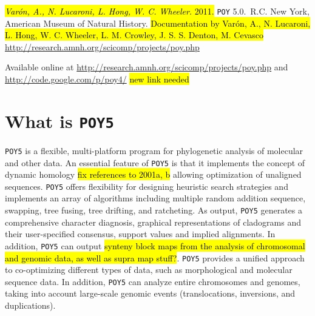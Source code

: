 \documentclass[11pt]{book}
\newcommand{\commandstyle}[1]{\texttt{#1}}
\newcommand{\poy}{\commandstyle{POY5}\xspace}
\begin{document}
\begin{flushleft}
\vspace*{0.25cm}
\hl{
\emph{Var\'on, A., N. Lucaroni, L. Hong, W. C. Wheeler.} 2011.}
\texttt{POY} 5.0.\buildnumber\ R.C. New York, American Museum of
Natural History. \hl{Documentation by Var\'on, A., N. Lucaroni, L. Hong, W. C. Wheeler, L. M. Crowley, J. S. S. Denton, M. Cevasco} \url{http://research.amnh.org/scicomp/projects/poy.php}

\vspace*{0.5cm}

Available online at
\url{http://research.amnh.org/scicomp/projects/poy.php}
and
\url{http://code.google.com/p/poy4/} 
\hl{new link needed}

\end{flushleft}

\tableofcontents


\chapter{What is \poy}

\poy is a flexible, multi-platform program for phylogenetic analysis of molecular and other data. %
An essential feature of \poy is that it implements the concept of dynamic homology \cite{wheeler2001a, wheeler2001} \hl{fix references to 2001a, b} allowing optimization of unaligned sequences. \poy offers flexibility for designing heuristic search strategies and implements an array of algorithms including multiple random addition sequence, swapping, tree fusing, tree drifting, and ratcheting. As output, \poy generates a comprehensive character diagnosis, graphical representations of cladograms and their user-specified consensus, support values and implied alignments.  In addition, \poy can output \hl{synteny block maps from the analysis of chromosomal and genomic data, as well as supra map stuff?}. \poy provides a unified approach to co-optimizing different types of data, such as morphological and molecular sequence data. In addition, \poy can analyze entire chromosomes and genomes, taking into account large-scale genomic events (translocations, inversions, and duplications).
\end{document}
